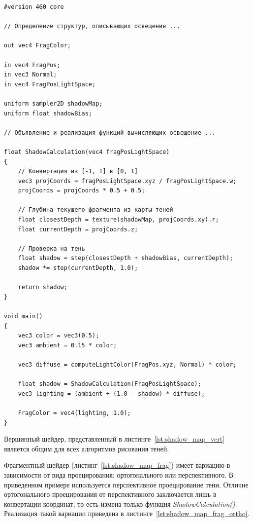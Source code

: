 \begin{center}
\captionsetup{justification=centering, singlelinecheck=off}
\begin{lstlisting}[label=lst:shadow_map_frag, caption=Фрагментный шейдер с учетом теней и освещения]
#version 460 core

// Определение структур, описывающих освещение ...

out vec4 FragColor;

in vec4 FragPos;
in vec3 Normal;
in vec4 FragPosLightSpace;

uniform sampler2D shadowMap;
uniform float shadowBias;

// Объявление и реализация функций вычисляющих освещение ...

float ShadowCalculation(vec4 fragPosLightSpace)
{
    // Конвертация из [-1, 1] в [0, 1]
    vec3 projCoords = fragPosLightSpace.xyz / fragPosLightSpace.w;
    projCoords = projCoords * 0.5 + 0.5;

    // Глубина текущего фрагмента из карты теней
    float closestDepth = texture(shadowMap, projCoords.xy).r; 
    float currentDepth = projCoords.z;

    // Проверка на тень
    float shadow = step(closestDepth + shadowBias, currentDepth);
    shadow *= step(currentDepth, 1.0);

    return shadow;
}

void main()
{
    vec3 color = vec3(0.5);
    vec3 ambient = 0.15 * color;

    vec3 diffuse = computeLightColor(FragPos.xyz, Normal) * color;

    float shadow = ShadowCalculation(FragPosLightSpace);                      
    vec3 lighting = (ambient + (1.0 - shadow) * diffuse);

    FragColor = vec4(lighting, 1.0);
}
\end{lstlisting}
\end{center}

Вершинный шейдер, представленный в листинге~\ref{lst:shadow_map_vert}
является общим для всех алгоритмов рисования теней.

Фрагментный шейдер (листинг~\ref{lst:shadow_map_frag}) имеет вариацию в зависимости
от вида проецирования: ортогонального или перспективного. В приведенном примере используется
перспективное проецирование тени. Отличие ортогонального проецирования от перспективного
заключается лишь в конвертации координат, то есть измена только функция
\textit{ShadowCalculation()}. Реализация такой вариации приведена в
листинге~\ref{lst:shadow_map_frag_ortho}.

